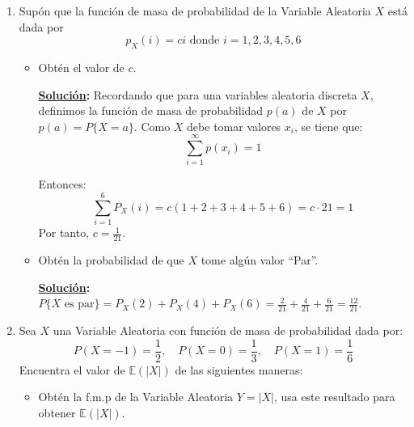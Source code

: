 \documentclass[11pt,letterpaper]{report}
\newcommand{\sol}{\textbf{\underline{Solución}: }} %
\begin{document}
\begin{enumerate}
\begin{itemize}
    \item Calcula $P(\frac{1}{2} < X < \frac{3}{2})$
    
    \sol Recordando que\footnote{Propiedad de un evento en términos de $F(x)$, página 140
    \emph{Introducción a la probabilidad}, Luis Rincón, 2016.}:
    $$P(a < x < b) = P(x < b) - P(x \leq a) = F(b_-) - F(a)$$

    \begin{align*}
        P(\frac{1}{2} < X < \frac{3}{2})
            &= P(x < \frac{3}{2}) - P(x \leq \frac{1}{2})\\
            &= \lim_{n \to \infty}F(\frac{1}{2} + \frac{\frac{3}{2}-1}{4}) - \frac{\frac{1}{2}}{4}\\
            &= \frac{1}{2}
    \end{align*}
\end{itemize}

\item Supón que la función de masa de probabilidad de la Variable Aleatoria $X$ está dada por
\[
    p_X(i) = ci \text{ donde } i = 1,2,3,4,5,6
\]
\begin{itemize}
    \item Obtén el valor de $c$.
    
    \sol Recordando que para una variables aleatoria discreta $X$, definimos la función de masa de
    probabilidad $p(a)$ de $X$ por $p(a) = P\{ X=a \}$. Como $X$ debe tomar valores $x_i$, se tiene que:
    $$\sum_{i=1}^{\infty}p(x_i) = 1$$

    Entonces:
    \[
        \sum_{i=1}^{6} P_X(i) = c(1+2+3+4+5+6) = c \cdot 21 = 1
    \]
    Por tanto, $c=\frac{1}{21}$.
    
    \item Obtén la probabilidad de que $X$ tome algún valor ``Par''.
    
    \sol $P\{ X \text{ es par} \} = P_X(2) + P_X(4) + P_X(6) =
        \frac{2}{21} + \frac{4}{21} + \frac{6}{21} = \frac{12}{21}$.
\end{itemize}

\item Sea $X$ una Variable Aleatoria con función de masa de probabilidad dada por:
\[
    P(X=-1)= \frac{1}{2},\quad P(X=0)=\frac{1}{3},\quad P(X=1)=\frac{1}{6}
    \]
    Encuentra el valor de $\mathds{E}(|X|)$ de las siguientes maneras:
    \begin{itemize}
        \item Obtén la f.m.p de la Variable Aleatoria $Y = |X|$, usa este resultado para
        obtener $\mathds{E}(|X|)$.
        

\end{itemize}
\end{enumerate}
\end{document}
